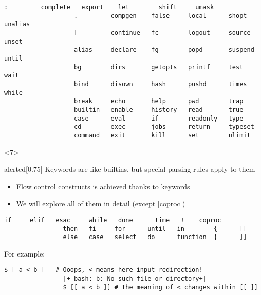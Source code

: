 \begin{frame}
\begin{overlayarea}{\textwidth}{0.7\textheight}
\begin{onlyenv}
\begin{onlyenv}
                \begin{lstlisting}[style=MyBash, numbers=none]
                   :         complete   export    let        shift     umask  
                   .         compgen    false     local      shopt     unalias
                   [         continue   fc        logout     source    unset  
                   alias     declare    fg        popd       suspend   until  
                   bg        dirs       getopts   printf     test      wait   
                   bind      disown     hash      pushd      times     while  
                   break     echo       help      pwd        trap      
                   builtin   enable     history   read       true      
                   case      eval       if        readonly   type      
                   cd        exec       jobs      return     typeset   
                   command   exit       kill      set        ulimit    
                \end{lstlisting}
            \end{onlyenv}
        \end{onlyenv}
        \begin{onlyenv}<7>
            \begin{varblock}{alerted}[0.75\textwidth]{}
                Keywords are like builtins, but \alert{special parsing rules apply to them}
            \end{varblock}
            \begin{itemize}
                \item Flow control constructs is achieved thanks to keywords
                \item We will explore all of them in detail (except \bash|coproc|)
            \end{itemize}
            \begin{lstlisting}[style=MyBash, numbers=none]
                if     elif   esac     while   done      time   !    coproc
                then   fi     for      until   in        {      [[
                else   case   select   do      function  }      ]]
            \end{lstlisting}
            \bigskip
            For example:
            \medskip
            \begin{lstlisting}[style=MyBash]
                $ [ a < b ]   # Ooops, < means here input redirection!
                |+-bash: b: No such file or directory+|
                $ [[ a < b ]] # The meaning of < changes within [[ ]]
            \end{lstlisting}

\end{onlyenv}
\end{overlayarea}
\end{frame}
